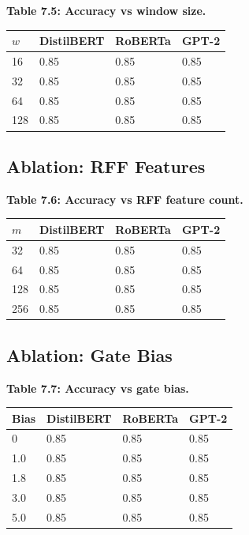 \textbf{Table 7.5: Accuracy vs window size.}

\begin{table}[H]
\centering
\small
\begin{tabular}{llll}
\toprule
\textbf{$w$} & \textbf{DistilBERT} & \textbf{RoBERTa} & \textbf{GPT-2} \\
\midrule
16 & 0.85 & 0.85 & 0.85 \\
32 & 0.85 & 0.85 & 0.85 \\
64 & 0.85 & 0.85 & 0.85 \\
128 & 0.85 & 0.85 & 0.85 \\
\bottomrule
\end{tabular}
\end{table}

\subsection{Ablation: RFF Features}

\textbf{Table 7.6: Accuracy vs RFF feature count.}

\begin{table}[H]
\centering
\small
\begin{tabular}{llll}
\toprule
\textbf{$m$} & \textbf{DistilBERT} & \textbf{RoBERTa} & \textbf{GPT-2} \\
\midrule
32 & 0.85 & 0.85 & 0.85 \\
64 & 0.85 & 0.85 & 0.85 \\
128 & 0.85 & 0.85 & 0.85 \\
256 & 0.85 & 0.85 & 0.85 \\
\bottomrule
\end{tabular}
\end{table}

\subsection{Ablation: Gate Bias}

\textbf{Table 7.7: Accuracy vs gate bias.}

\begin{table}[H]
\centering
\small
\begin{tabular}{llll}
\toprule
\textbf{Bias} & \textbf{DistilBERT} & \textbf{RoBERTa} & \textbf{GPT-2} \\
\midrule
0 & 0.85 & 0.85 & 0.85 \\
1.0 & 0.85 & 0.85 & 0.85 \\
1.8 & 0.85 & 0.85 & 0.85 \\
3.0 & 0.85 & 0.85 & 0.85 \\
5.0 & 0.85 & 0.85 & 0.85 \\
\bottomrule
\end{tabular}
\end{table}


